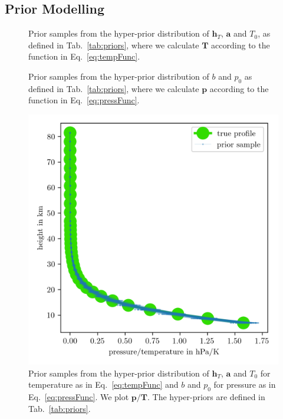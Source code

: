 \subsection{Prior Modelling}
\label{subsec:PriorFull}
\begin{figure}[ht!]
	\centering
	
	\caption[Prior Samples of $\bm{T}$ according to the respective hyper-prior distribution.]{Prior samples from the hyper-prior distribution of $\bm{h}_T$, $\bm{a}$ and $T_0$, as defined in Tab.~\ref{tab:priors}, where we calculate $\bm{T}$ according to the function in Eq.~\ref{eq:tempFunc}.}
	\label{fig:PriorTemp}
\end{figure}
\begin{figure}[ht!]
	\centering
	
	\caption[Prior Samples of $\bm{p}$ according to the respective hyper-prior distribution.]{Prior samples from the hyper-prior distribution of $b$ and $p_0$ as defined in Tab.~\ref{tab:priors}, where we calculate $\bm{p}$ according to the function in Eq.~\ref{eq:pressFunc}.}
	\label{fig:PriorPress}
\end{figure}
\begin{figure}[ht!]
	\centering
	\includegraphics{PriorTempOverPostMeanSigm.png}
	\caption[Prior Samples of $\bm{p}/\bm{T}$ according to the respective hyper-prior distribution.]{Prior samples from the hyper-prior distribution of $\bm{h}_T$, $\bm{a}$ and $T_0$ for temperature as in Eq.~\ref{eq:tempFunc} and $b$ and $p_0$ for pressure as in Eq.~\ref{eq:pressFunc}. We plot $\bm{p}/\bm{T}$. The hyper-priors are defined in Tab.~\ref{tab:priors}.}
	\label{fig:PriorPressOverTemp}
\end{figure}
